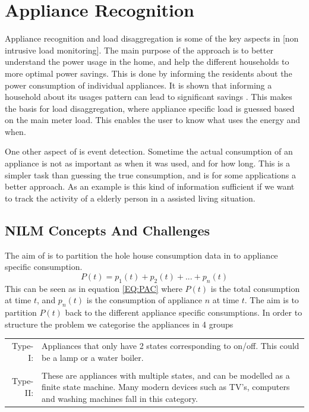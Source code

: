 \chapter{Appliance Recognition }

Appliance recognition and load disaggregation is some of the key aspects in [non intrusive load monitoring]. The main purpose of the  approach is to better understand the power usage in the home, and help the different households to more optimal power savings. This is done by informing the residents about the power consumption of individual appliances. It is shown that informing a household about its usages pattern can lead to significant savings \citep{RefWorks:33}. This makes the basis for load disaggregation, where appliance specific load is guessed based on the main meter load. This enables the user to know what uses the energy and when.

One other aspect of  is event detection. Sometime the actual consumption of an appliance is not as important as when it was used, and for how long. This is a simpler task than guessing the true consumption, and is for some applications a better approach. As an example is this kind of information sufficient if we want to track the activity of a elderly person in a assisted living situation. 

\section{NILM Concepts And Challenges} 
The aim of  is to partition the hole house consumption data in to appliance specific consumption. 
\begin{equation}
	P(t) = p_1(t) + p_2(t) + ... + p_n(t)
	\label{EQ:PAC}
\end{equation}
This can be seen as in equation \ref{EQ:PAC} where $P(t)$ is the total consumption at time $t$, and $p_n(t)$ is the consumption of appliance $n$ at time $t$. The aim is to partition $P(t)$ back to the different appliance specific consumptions. In order to structure the problem we categorise the appliances in 4 groups\citep{RefWorks:17} 

\begin{tabularx}{\linewidth}{ r X }
Type-I:&Appliances that only have 2 states corresponding to on/off. This could be a lamp or a water boiler. \\
\\
Type-II:&These are appliances with multiple states, and can be modelled as a finite state machine. Many modern devices such as TV's, computers and washing machines fall in this category.   \\
\end{tabularx}

